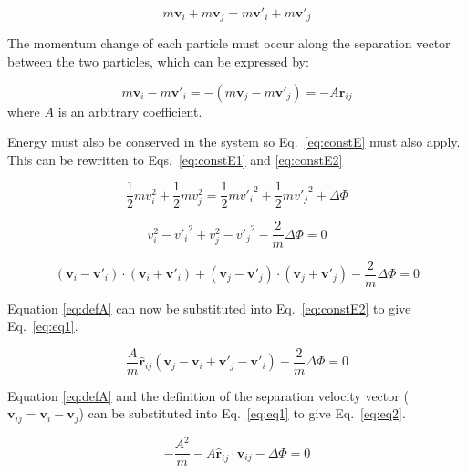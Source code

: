 \documentclass[12pt]{UoAthesis} \usepackage{booktabs}
\begin{document}
\begin{equation}
\label{eq:consMom}
m\mathbf{v}_i + m\mathbf{v}_j = m\mathbf{v}'_i + m\mathbf{v}'_j
\end{equation}

The momentum change of each particle must occur along the separation
vector between the two particles, which can be expressed by:

\begin{equation}
  \label{eq:defA}
  m\mathbf{v}_i - m\mathbf{v}'_i = -(m\mathbf{v}_j - m\mathbf{v}'_j) 
  = -A\mathbf{\hat{r}}_{ij}
\end{equation}
where $A$ is an arbitrary coefficient.

Energy must also be conserved in the system so Eq.~\eqref{eq:constE}
must also apply.  This can be rewritten to Eqs.~\eqref{eq:constE1} and
\eqref{eq:constE2}

\begin{equation}
  \label{eq:constE}
  \frac{1}{2}mv_i^2 + \frac{1}{2}mv_j^2 =
  \frac{1}{2}m{v'_i}^2 + \frac{1}{2}m{v'_j}^2 + \Delta \Phi
\end{equation}

\begin{equation}
  \label{eq:constE1}
  v_i^2 - {v'_i}^2 +
  v_j^2 - {v'_j}^2 - \frac{2}{m}\Delta \Phi = 0
\end{equation}

\begin{equation}
  \label{eq:constE2}
  (\mathbf{v}_i - \mathbf{v}'_i)\cdot(\mathbf{v}_i + \mathbf{v}'_i) +
  (\mathbf{v}_j - \mathbf{v}'_j)\cdot(\mathbf{v}_j + \mathbf{v}'_j) -
  \frac{2}{m}\Delta \Phi = 0
\end{equation}

Equation \eqref{eq:defA} can now be substituted into
Eq.~\eqref{eq:constE2} to give Eq.~\eqref{eq:eq1}.

\begin{equation}
  \label{eq:eq1}
  \frac{A}{m}\mathbf{\hat{r}}_{ij} (\mathbf{v}_j - \mathbf{v}_i 
  + \mathbf{v}'_j - \mathbf{v}'_i) - \frac{2}{m}\Delta \Phi = 0
\end{equation}

Equation \eqref{eq:defA} and the definition of the separation velocity
vector ($\mathbf{v}_{ij} = \mathbf{v}_i - \mathbf{v}_j$) can be
substituted into Eq.~\eqref{eq:eq1} to give Eq.~\eqref{eq:eq2}.

\begin{equation}
  \label{eq:eq2}
  -\frac{A^2}{m}
  -A\mathbf{\hat{r}}_{ij}\cdot\mathbf{v}_{ij} - \Delta \Phi = 0
\end{equation}
\end{document}
